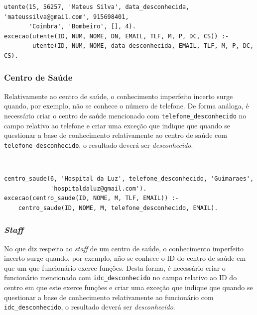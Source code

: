 \documentclass[a4paper, 11pt]{article}
\begin{document}
\begin{lstlisting}[caption={Conhecimento Imperfeito Incerto relativo ao utente}]
% Nao se conhece a idade do utente #15 uma vez que a sua data de nascimento e desconhecida
utente(15, 56257, 'Mateus Silva', data_desconhecida, 'mateussilva@gmail.com', 915698401,
       'Coimbra', 'Bombeiro', [], 4).
excecao(utente(ID, NUM, NOME, DN, EMAIL, TLF, M, P, DC, CS)) :-
        utente(ID, NUM, NOME, data_desconhecida, EMAIL, TLF, M, P, DC, CS).

\end{lstlisting}

\subsubsection*{Centro de Saúde}

Relativamente ao centro de saúde, o conhecimento imperfeito incerto surge quando, por exemplo, 
não se conhece o número de telefone. 
De forma análoga, é necessário criar o centro de saúde mencionado com
\texttt{telefone\_desconhecido} no campo relativo ao telefone e criar uma exceção que indique que 
quando se questionar a base de conhecimento relativamente ao centro de saúde com 
\texttt{telefone\_desconhecido}, o resultado deverá ser \textit{desconhecido}.

\

\begin{lstlisting}[caption={Conhecimento Imperfeito Incerto relativo ao centro de saúde}]
% Nao se conhece o telefone do centro de saude #6
centro_saude(6, 'Hospital da Luz', telefone_desconhecido, 'Guimaraes',
             'hospitaldaluz@gmail.com').
excecao(centro_saude(ID, NOME, M, TLF, EMAIL)) :- 
    centro_saude(ID, NOME, M, telefone_desconhecido, EMAIL).
\end{lstlisting}

\subsubsection*{\textit{Staff}}

No que diz respeito ao \textit{staff} de um centro de saúde, o conhecimento imperfeito incerto 
surge quando, por exemplo, não se 
conhece o ID do centro de saúde em que um que funcionário exerce funções. Desta forma, é 
necessário criar o funcionário mencionado com
\texttt{idc\_desconhecido} no campo relativo ao ID do centro em que este exerce funções e criar 
uma exceção que indique que quando
se questionar a base de conhecimento relativamente ao funcionário com \texttt{idc\_desconhecido}, 
o resultado deverá ser \textit{desconhecido}.
\end{document}
